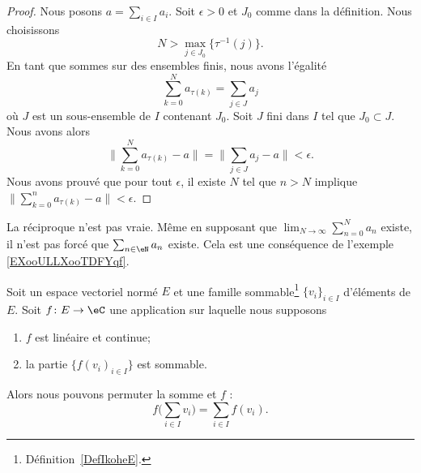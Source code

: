 \begin{proof}
	Nous posons \( a=\sum_{i\in I}a_i\). Soit \( \epsilon>0\) et \( J_0\) comme dans la définition. Nous choisissons
	\begin{equation}
		N>\max_{j\in J_0}\{ \tau^{-1}(j) \}.
	\end{equation}
	En tant que sommes sur des ensembles finis, nous avons l'égalité
	\begin{equation}
		\sum_{k=0}^Na_{\tau(k)}=\sum_{j\in J}a_j
	\end{equation}
	où \( J\) est un sous-ensemble de \( I\) contenant \( J_0\). Soit \( J\) fini dans \( I\) tel que \( J_0\subset J\). Nous avons alors
	\begin{equation}
		\| \sum_{k=0}^Na_{\tau(k)}-a \|=\| \sum_{j\in J}a_j-a \|<\epsilon.
	\end{equation}
	Nous avons prouvé que pour tout \( \epsilon\), il existe \( N\) tel que \( n>N\) implique \( \| \sum_{k=0}^na_{\tau(k)}-a\| <\epsilon\).
\end{proof}

La réciproque n'est pas vraie. Même en supposant que \( \lim_{N\to \infty} \sum_{n=0}^Na_n\) existe, il n'est pas forcé que \( \sum_{n\in\eN}a_n\) existe. Cela est une conséquence de l'exemple \ref{EXooULLXooTDFYqf}.


\begin{proposition}     \label{PROPooWLEDooJogXpQ}
	Soit un espace vectoriel normé \( E\) et une famille sommable\footnote{Définition~\ref{DefIkoheE}.} \( \{ v_i \}_{i\in I}\) d'éléments de \( E\). Soit \( f\colon E\to \eC\) une application sur laquelle nous supposons
	\begin{enumerate}
		\item
		      \( f\) est linéaire et continue;
		\item
		      la partie \( \{ f(v_i)_{i\in I} \} \) est sommable.
	\end{enumerate}
	Alors nous pouvons permuter la somme et \( f\) :
	\begin{equation}        \label{EQooONHXooKqIEbY}
		f\big( \sum_{i\in I}v_i \big)=\sum_{i\in I}f(v_i).
	\end{equation}
\end{proposition}

